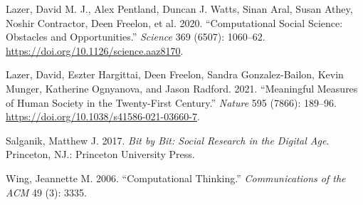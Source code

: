 \documentclass[
  letterpaper,
  DIV=11,
  numbers=noendperiod]{scrreprt}
\newlength{\cslhangindent}
\newlength{\cslentryspacingunit} %
\newenvironment{CSLReferences}[2] %
 {%
  \setlength{\parindent}{0pt}
  \ifodd #1
  \let\oldpar\par
  \def\par{\hangindent=\cslhangindent\oldpar}
  \fi
  \setlength{\parskip}{#2\cslentryspacingunit}
 }%
 {}
\begin{document}
\hypertarget{refs}{}
\begin{CSLReferences}{1}{0}
\leavevmode{}%
Lazer, David M. J., Alex Pentland, Duncan J. Watts, Sinan Aral, Susan
Athey, Noshir Contractor, Deen Freelon, et al. 2020. {``Computational
Social Science: Obstacles and Opportunities.''} \emph{Science} 369
(6507): 1060--62. \url{https://doi.org/10.1126/science.aaz8170}.

\leavevmode{}%
Lazer, David, Eszter Hargittai, Deen Freelon, Sandra Gonzalez-Bailon,
Kevin Munger, Katherine Ognyanova, and Jason Radford. 2021.
{``Meaningful Measures of Human Society in the Twenty-First Century.''}
\emph{Nature} 595 (7866): 189--96.
\url{https://doi.org/10.1038/s41586-021-03660-7}.

\leavevmode{}%
Salganik, Matthew J. 2017. \emph{Bit by Bit: Social Research in the
Digital Age}. Princeton, NJ.: Princeton University Press.

\leavevmode{}%
Wing, Jeannette M. 2006. {``Computational Thinking.''}
\emph{Communications of the ACM} 49 (3): 3335.

\end{CSLReferences}
\end{document}
